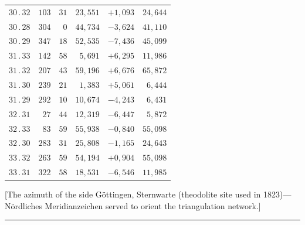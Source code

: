 \begin{center}
\begin{tabular}[t]{|c|r@{\;}r@{\;}r|r|r|}
$30\, .\, 32$ & $103$ & $31$ & $23{,}551$ & $+1{,}093$ & $24{,}644$\\
$30\, .\, 28$ & $304$ & $0$ & $44{,}734$ & $-3{,}624$ & $41{,}110$\\
$30\, .\, 29$ & $347$ & $18$ & $52{,}535$ & $-7{,}436$ & $45{,}099$\\[7pt]
$31\, .\, 33$ & $142$ & $58$ & $5{,}691$ & $+6{,}295$ & $11{,}986$\\
$31\, .\, 32$ & $207$ & $43$ & $59{,}196$ & $+6{,}676$ & $65{,}872$\\
$31\, .\, 30$ & $239$ & $21$ & $1{,}383$ & $+5{,}061$ & $6{,}444$\\
$31\, .\, 29$ & $292$ & $10$ & $10{,}674$ & $-4{,}243$ & $6{,}431$\\[7pt]
$32\, .\, 31$ & $27$ & $44$ & $12{,}319$ & $-6{,}447$ & $5{,}872$\\
$32\, .\, 33$ & $83$ & $59$ & $55{,}938$ & $-0{,}840$ & $55{,}098$\\
$32\, .\, 30$ & $283$ & $31$ & $25{,}808$ & $-1{,}165$ & $24{,}643$\\[7pt]
$33\, .\, 32$ & $263$ & $59$ & $54{,}194$ & $+0{,}904$ & $55{,}098$\\
$33\, .\, 31$ & $322$ & $58$ & $18{,}531$ & $-6{,}546$ & $11{,}985$\\
\end{tabular}
\end{center}

[The azimuth of the side Göttingen,
Sternwarte (theodolite site used in 1823)---Nördliches Meridianzeichen served to orient the triangulation network.]
\begin{center}\rule{.23\linewidth}{.35pt}\end{center}

